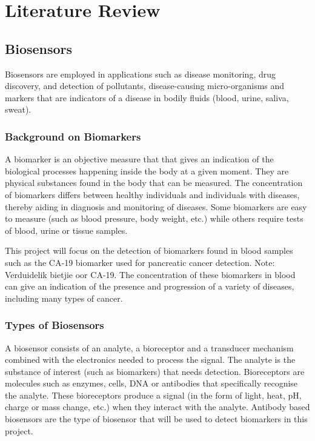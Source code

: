 \graphicspath{{literature_review/fig/}}

\chapter{Literature Review}
\section{Biosensors}
Biosensors are employed in applications such as disease monitoring, drug discovery, and detection of pollutants, disease-causing micro-organisms and markers that are indicators of a disease in bodily fluids (blood, urine, saliva, sweat).\cite{bhallaIntroductionBiosensors2016} 
\subsection{Background on Biomarkers}
A biomarker is an objective measure that that gives an indication of the biological processes happening inside the body at a given moment.\cite{BiomarkersNationalInstitute} They are physical substances found in the body that can be measured. The concentration of biomarkers differs between healthy individuals and individuals with diseases, thereby aiding in diagnosis and monitoring of diseases.\cite{rosenzweigWhatArePancreatic2018} Some biomarkers are easy to measure (such as blood pressure, body weight, etc.) while others require tests of blood, urine or tissue samples.\cite{BiomarkersNationalInstitute} 

This project will focus on the detection of biomarkers found in blood samples such as the CA-19 biomarker used for pancreatic cancer detection. Note: Verduidelik bietjie oor CA-19. The concentration of these biomarkers in blood can give an indication of the presence and progression of a variety of diseases, including many types of cancer.\cite{ribeiroApplicationsElectrochemicalImpedance2024}

\subsection{Types of Biosensors}
A biosensor consists of an analyte, a bioreceptor and a transducer mechanism combined with the electronics needed to process the signal.\cite{bhallaIntroductionBiosensors2016} The analyte is the substance of interest (such as biomarkers) that needs detection. Bioreceptors are molecules such as enzymes, cells, DNA or antibodies that specifically recognise the analyte. These bioreceptors produce a signal (in the form of light, heat, pH, charge or mass change, etc.) when they interact with the analyte.\cite{bhallaIntroductionBiosensors2016} Antibody based biosensors are the type of biosensor that will be used to detect biomarkers in this project.

